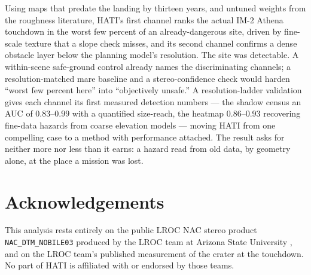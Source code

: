 \documentclass[11pt]{article}
\begin{document}
Using maps that predate the landing by thirteen years, and untuned weights from the
roughness literature, HATI's first channel ranks the actual IM-2 Athena touchdown in
the worst few percent of an already-dangerous site, driven by fine-scale texture that
a slope check misses, and its second channel confirms a dense obstacle layer below
the planning model's resolution. The site was detectable. A within-scene safe-ground control already names the
discriminating channels; a resolution-matched mare baseline and a stereo-confidence
check would harden ``worst few percent here'' into ``objectively unsafe.'' A
resolution-ladder validation gives each channel its first measured detection numbers ---
the shadow census an AUC of $0.83$--$0.99$ with a quantified size-reach, the heatmap
$0.86$--$0.93$ recovering fine-data hazards from coarse elevation models --- moving HATI
from one compelling case to a method with performance attached. The result asks for
neither more nor less than it earns: a hazard read from old data, by geometry alone, at
the place a mission was lost.

\section*{Acknowledgements}
This analysis rests entirely on the public LROC NAC stereo product
\texttt{NAC\_DTM\_NOBILE03} produced by the LROC team at Arizona State University
\autocite{robinson2010}, and on the LROC team's published measurement of the crater at
the touchdown. No part of HATI is affiliated with or endorsed by those teams.

\appendix
\end{document}
